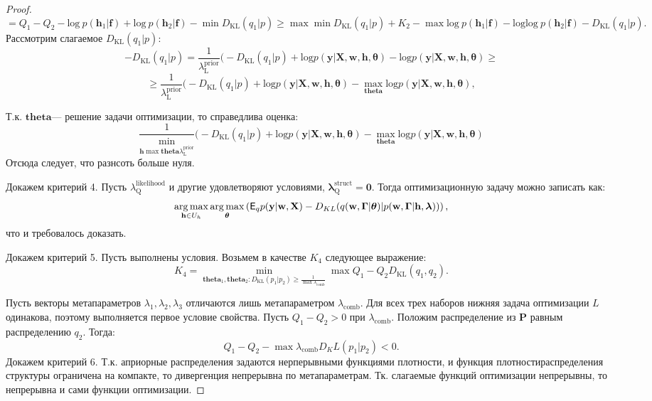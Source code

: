 \begin{proof}
\[
= Q_1-Q_2-\text{log}~p (\mathbf{h}_1|\mathbf{f})+\text{log}~p (\mathbf{h}_2|\mathbf{f})-\min D_\text{KL}(q_1|p)\geq\max\min D_\text{KL}(q_1|p)+K_2-\max\text{log}~p (\mathbf{h}_1|\mathbf{f})-\text{log}\text{log}~p(\mathbf{h}_2|\mathbf{f})-D_\text{KL}(q_1|p).\]
Рассмотрим слагаемое $D_\text{KL}(q_1|p):$
\[-D_\text{KL}(q_1|p)=\frac{1}{\lambda^\text{prior}_\text{L}} \bigl (-D_\text{KL}(q_1|p)+\text{log}p(\mathbf{y}|\mathbf{X}, \mathbf{w}, \mathbf{h},\boldsymbol{\theta})-\text{log}p(\mathbf{y}|\mathbf{X}, \mathbf{w}, \mathbf{h}, \boldsymbol{\theta})\geq
\]
\[
\geq \frac{1}{\lambda^\text{prior}_\text{L}}\bigl(-D_\text{KL}(q_1|p)+\text{log}p(\mathbf{y}|\mathbf{X}, \mathbf{w}, \mathbf{h}, \boldsymbol{\theta})-\max_{\boldsymbol{theta}}\text{log}p(\mathbf{y}|\mathbf{X}, \mathbf{w}, \mathbf{h}, \boldsymbol{\theta}),
\]

Т.к. $\boldsymbol{theta}$--- решение задачи оптимизации, то справедлива оценка:
\[
\frac{1}{\min_{\mathbf{h}\max{\boldsymbol{theta}}\lambda^\text{prior}_\text{L}}}\bigl(-D_\text{KL}(q_1|p)+\text{log}p(\mathbf{y}|\mathbf{X}, \mathbf{w}, \mathbf{h},\boldsymbol{\theta})-\max_{\boldsymbol{theta}}\text{log}p(\mathbf{y}|\mathbf{X}, \mathbf{w}, \mathbf{h}, \boldsymbol{\theta})
\]
Отсюда следует, что разнсоть больше нуля. 

Докажем критерий 4. Пусть $\lambda^\text{likelihood}_\text{Q}$  и другие удовлетворяют условиями, $\boldsymbol{\lambda}^\text{struct}_\text{Q} = \mathbf{0}$. Тогда оптимизационную задачу можно записать как: $$\operatorname*{arg\,max}_{\mathbf{h} \in U_h}\operatorname*{arg\,max}_{\boldsymbol{\theta}} \left(\mathsf{E}_q p(\mathbf{y}|\mathbf{w}, \mathbf{X})-{D}_{KL}(q(\mathbf{w}, \boldsymbol{\Gamma}|\boldsymbol{\theta})|p(\mathbf{w}, \boldsymbol{\Gamma}|\mathbf{h}, \boldsymbol{\lambda}))\right),$$ что и требовалось доказать.

Докажем критерий 5. Пусть выполнены условия.
Возьмем в качестве $K_4$ следующее выражение:
\[
K_4 = \min_{\boldsymbol{theta}_1, \boldsymbol{theta}_2: D_\text{KL}(p_1|p_2) \geq \frac{1}{\max{\lambda_{\text{comb}}}}}\max Q_1-Q_2 D_\text{KL}(q_1,q_2).
\]

Пусть векторы метапараметров $\lambda_1, \lambda_2, \lambda_3$ отличаются лишь метапараметром $\lambda_\text{comb}$. Для всех трех наборов нижняя задача  оптимизации $L$ одинакова, поэтому выполняется первое условие свойства.
Пусть $Q_1-Q_2 > 0$ при $\lambda_\text{comb}.$
Положим распределение из $\mathbf{P}$ равным распределению $q_2$. Тогда:
\[
Q_1-Q_2-\max{\lambda_\text{comb}}D_KL(p_1|p_2)<0.
\]
Докажем критерий 6. Т.к. априорные распределения задаются нерперывными функциями плотности, и функция плотностираспределения структуры ограничена на компакте, то дивергенция непрерывна по метапараметрам. Тк. слагаемые функций оптимизации непрерывны, то непрерывна и сами функции оптимизации.
\end{proof}

